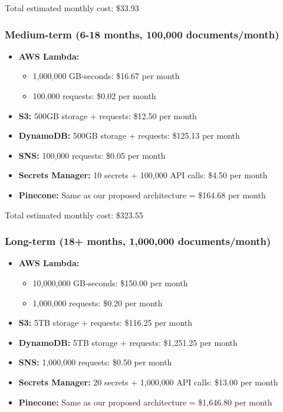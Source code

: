 \documentclass[a4paper, 12pt]{report}
\begin{document}
Total estimated monthly cost: \$33.93

\subsubsection{Medium-term (6-18 months, 100,000 documents/month)}

\begin{itemize}
    \item \textbf{AWS Lambda:} 
        \begin{itemize}
            \item 1,000,000 GB-seconds: \$16.67 per month
            \item 100,000 requests: \$0.02 per month
        \end{itemize}
    \item \textbf{S3:} 500GB storage + requests: \$12.50 per month
    \item \textbf{DynamoDB:} 500GB storage + requests: \$125.13 per month
    \item \textbf{SNS:} 100,000 requests: \$0.05 per month
    \item \textbf{Secrets Manager:} 10 secrets + 100,000 API calls: \$4.50 per month
    \item \textbf{Pinecone:} Same as our proposed architecture = \$164.68 per month
\end{itemize}

Total estimated monthly cost: \$323.55

\subsubsection{Long-term (18+ months, 1,000,000 documents/month)}

\begin{itemize}
    \item \textbf{AWS Lambda:} 
        \begin{itemize}
            \item 10,000,000 GB-seconds: \$150.00 per month
            \item 1,000,000 requests: \$0.20 per month
        \end{itemize}
    \item \textbf{S3:} 5TB storage + requests: \$116.25 per month
    \item \textbf{DynamoDB:} 5TB storage + requests: \$1,251.25 per month
    \item \textbf{SNS:} 1,000,000 requests: \$0.50 per month
    \item \textbf{Secrets Manager:} 20 secrets + 1,000,000 API calls: \$13.00 per month
    \item \textbf{Pinecone:} Same as our proposed architecture = \$1,646.80 per month
\end{itemize}
\end{document}
